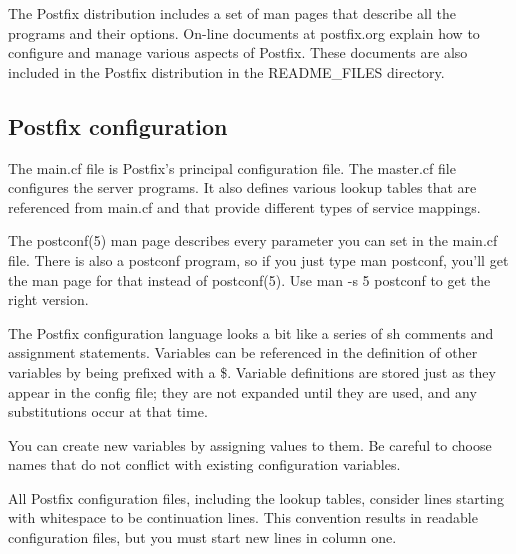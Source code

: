 The Postfix distribution includes a set of man pages that describe all
the programs and their options. On-line documents at postfix.org explain
how to configure and manage various aspects of Postfix. These documents
are also included in the Postfix distribution in the {README\_FILES}
directory.

\protect\hypertarget{part0026_split_061.html}{}{}

\hypertarget{part0026_split_061.htmlux5cux23_idContainer1247}{}
\hypertarget{part0026_split_061.htmlux5cux23calibre_pb_60}{%
\subsection[Postfix
configuration]{\texorpdfstring{\protect\hypertarget{part0026_split_061.htmlux5cux23_idTextAnchor1172}{}{}Postfix
configuration}{Postfix configuration}}\label{part0026_split_061.htmlux5cux23calibre_pb_60}}

\protect\hypertarget{part0026_split_061.htmlux5cux23_idIndexMarker2707}{}{}The
\protect\hypertarget{part0026_split_061.htmlux5cux23_idIndexMarker2708}{}{}{main.cf}
file is Postfix's principal configuration file. The
\protect\hypertarget{part0026_split_061.htmlux5cux23_idIndexMarker2709}{}{}{master.cf}
file configures the server programs. It also defines various lookup
tables that are referenced from {main.cf} and that provide different
types of service mappings.

The {postconf}(5) man page describes every parameter you can set in the
{main.cf} file. There is also a {postconf} program, so if you just type
{man postconf}, you'll get the man page for that instead of
{postconf}(5). Use {man -s 5 postconf} to get the right version.

The Postfix configuration language looks a bit like a series of {sh}
comments and assignment statements. Variables can be referenced in the
definition of other variables by being prefixed with a {\$}. Variable
definitions are stored just as they appear in the config file; they are
not expanded until they are used, and any substitutions occur at that
time.

You can create new variables by assigning values to them. Be careful to
choose names that do not conflict with existing configuration variables.

All Postfix configuration files, including the lookup tables, consider
lines starting with whitespace to be continuation lines. This convention
results in readable configuration files, but you must start new lines in
column one.

